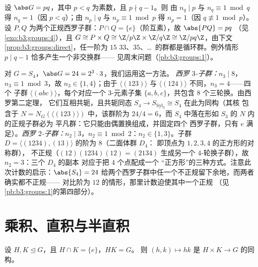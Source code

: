 \begin{example}\label{ex:b3:groups:pq}
设 $\abs G = pq$，其中 $p < q$ 为素数，且 $p \nmid q - 1$。则
由 $n_q \mid p$ 与 $n_q \equiv 1 \bmod q$ 得 $n_q = 1$（因 $p <
q$）；由 $n_p \mid q$ 与 $n_p \equiv 1 \bmod p$ 得 $n_p = 1$（因 $q
\not\equiv 1 \bmod p$）。设 $P, Q$ 为两个正规西罗子群：$P
\cap Q = \{e\}$（阶互素），故 $\abs{PQ} = pq$
（见\cref{exo:b3:groups:4}），且 $G \cong P \times Q \cong \Z/p\Z
\times \Z/q\Z \cong \Z/pq\Z$，由下文
\cref{prop:b3:groups:direct}，任一阶为 $15$
$33$、$35$、\dots\ 的群都是循环群。例外情形 $p \mid q - 1$
恰多产生一个非交换群——
见周末问题（\cref{pb:b3:groups:1}）。
\end{example}

\begin{example}[西罗子群的完整计数：$S_4$]
\label{ex:b3:groups:s4sylow}
对 $G = S_4$，$\abs G = 24 = 2^3\cdot3$，我们运用这一方法。
\emph{西罗 $3$-子群：}$n_3 \mid 8$，$n_3 \equiv 1 \bmod 3$，故 $n_3
\in \{1, 4\}$；由于 $\langle(123)\rangle$ 与
$\langle(124)\rangle$ 不同，$n_3 = 4$——四个
子群 $\langle(abc)\rangle$，每个对应一个 $3$-元素子集
$\{a, b, c\}$，共包含 $8$ 个三轮换。由西罗第二定理，
它们互相共轭，且共轭同态 $S_4 \to
S_{\mathrm{Syl}_3} \cong S_4$ 在此为同构（其核
包含于 $N = N_G(\langle(123)\rangle)$ 中，该群阶为 $24/4 =
6$，而 $S_4$ 中落在形如 $S_3$ 的 $N$ 内的正规子群必为
平凡群：它只能由偶置换组成，并固定四个
西罗子群，只有 $e$ 满足）。\emph{西罗 $2$-子群：}$n_2 \mid 3$，$n_2
\equiv 1 \bmod 2$：$n_2 \in \{1, 3\}$。子群 $D =
\langle(1234), (13)\rangle$ 的阶为 $8$（二面体群 $D_4$：
即顶点为 $1, 2, 3, 4$ 的正方形的对称群），
不正规（$(12)(1234)(12) = (2134)$ 生成另一个
$4$-轮换子群），故 $n_2 = 3$：三个 $D_4$ 的副本
对应于把 $4$ 个点配成一个
“正方形”的三种方式。注意此次计数的启示：$\abs{S_4} = 24$
给两个西罗子群中任一个不正规留下余地，而两者确实都不正规——
对比阶为 $12$ 的情形，那里计数迫使其中一个正规
（见\cref{pb:b3:groups:1}的第四部分）。
\end{example}

\section{乘积、直积与半直积}

\begin{proposition}[直积的识别]\label{prop:b3:groups:direct}
设 $H, K \trianglelefteq G$，且 $H \cap K = \{e\}$，$HK = G$。
则 $(h,k) \mapsto hk$ 是 $H \times K \to
G$ 的同构。
\end{proposition}

